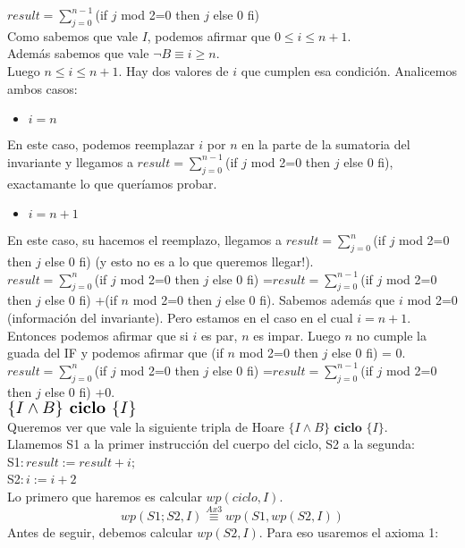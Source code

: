 \documentclass{article}
\begin{document}
	$result=\sum_{j=0}^{n-1}$(if $j$ mod 2=0 then $j$ else 0 fi)\\
	Como sabemos que vale $I$, podemos afirmar que $0\leq i\leq n+1$.\\ Además sabemos que vale $\neg B\equiv i\geq n$.
	\\ Luego $n\leq i\leq n+1$. Hay dos valores de $i$ que cumplen esa condición. Analicemos ambos casos:\\
	\begin{itemize}
	\item $i=n$
	\end{itemize}
	En este caso, podemos reemplazar $i$ por $n$ en la parte de la sumatoria del invariante y llegamos a
	 $result=\sum_{j=0}^{n-1}$(if $j$ mod 2=0 then $j$ else 0 fi), exactamante lo que queríamos probar.
	 \begin{itemize}
	\item $i=n+1$
	\end{itemize}
	En este caso, su hacemos el reemplazo, llegamos a  
	$result=\sum_{j=0}^{n}$(if $j$ mod 2=0 then $j$ else 0 fi) (y esto no es a lo que queremos llegar!).\\
	$result=\sum_{j=0}^{n}$(if $j$ mod 2=0 then $j$ else 0 fi) =$result=\sum_{j=0}^{n-1}$(if $j$ mod 2=0 then $j$ else 0 fi) 
	+(if $n$ mod 2=0 then $j$ else 0 fi). Sabemos además que $i$ mod 2=0 (información del invariante). Pero estamos en el caso en el cual
	 $i=n+1$. Entonces podemos afirmar que si $i$ es par, $n$ es impar. Luego $n$ no cumple la guada del IF y podemos afirmar que 
	 (if $n$ mod 2=0 then $j$ else 0 fi) = 0.\\
	 $result=\sum_{j=0}^{n}$(if $j$ mod 2=0 then $j$ else 0 fi) =$result=\sum_{j=0}^{n-1}$(if $j$ mod 2=0 then $j$ else 0 fi) +0.\medskip\\
	$\scalebox{1.3}{$\{I\wedge B\} \textbf{ ciclo } \{I\}$}$\medskip \\
	Queremos ver que vale la siguiente tripla de Hoare $\{I\wedge B\} \textbf{ ciclo } \{I\}$.\\
	Llamemos S1 a la primer instrucción del cuerpo del ciclo, S2 a la segunda:\\
	S1$: result:=result+i;$\\
	S2$: i:=i+2$\\
	Lo primero que haremos es calcular $wp(ciclo,I)$.
	\begin{equation}wp(S1;S2,I)\stackrel{Ax3}{\equiv}wp(S1,wp(S2,I))\end{equation}
	Antes de seguir, debemos calcular $wp(S2,I)$. Para eso usaremos el axioma 1:
\end{document}
